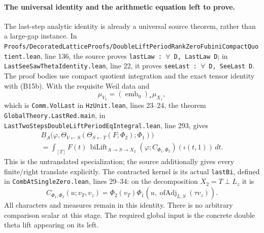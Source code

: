 \paragraph{The universal identity and the arithmetic equation left to prove.}
The last-step analytic identity is already a universal source theorem, rather than a large-gap instance. In \texttt{Proofs/\allowbreak{}DecoratedLatticeProofs/\allowbreak{}DoubleLiftPeriodRankZeroFubiniCompactQuotient.lean}, line 136, the source proves \texttt{lastLaw : \ensuremath{\forall} D, LastLaw D}; in \texttt{LastSeeSawThetaIdentity.lean}, line 22, it proves \texttt{seeLast : \ensuremath{\forall} D, SeeLast D}. The proof bodies use compact quotient integration and the exact tensor identity with (B15b). With the requisite Weil data and
\[
 \mu_{V_1}=(\operatorname{emb}_0)_*\mu_{X_1},
 \tag{B15k}
\]
which is \texttt{Comm.VolLast} in \texttt{HzUnit.lean}, lines 23--24, the theorem \texttt{GlobalTheory.LastRed.main}, in \texttt{LastTwoStepsDoubleLiftPeriodEqIntegral.lean}, line 293, gives
\begin{equation}
\begin{gathered}
 B_A\bigl(\varphi,
   \Theta_{V\leftarrow S}(\Theta_{S\leftarrow T}(F;\Phi_2);\Phi_1)\bigr)
 \\
  =\int_{[T]} F(t)\,
       \operatorname{biLift}_{A\to S\to X_2}
       (\varphi;C_{\Phi_1,\Phi_2})(\iota(t,1))\,dt.
\end{gathered}
 \tag{B15l}
\end{equation}
This is the untranslated specialization; the source additionally gives every finite/right translate explicitly. The contracted kernel is its actual \texttt{lastBi}, defined in \texttt{CombAtSingleZero.lean}, lines 29--34: on the decomposition $X_2=T\perp L_z$ it is
\[
 C_{\Phi_1,\Phi_2}(u;v_T,v_z)
       =\Phi_2(v_T)\Phi_1(u,\operatorname{ofAdj}_{L,S}(\tau v_z)).
\]
All characters and measures remain in this identity. There is no arbitrary comparison scalar at this stage. The required global input is the concrete double theta lift appearing on its left.

